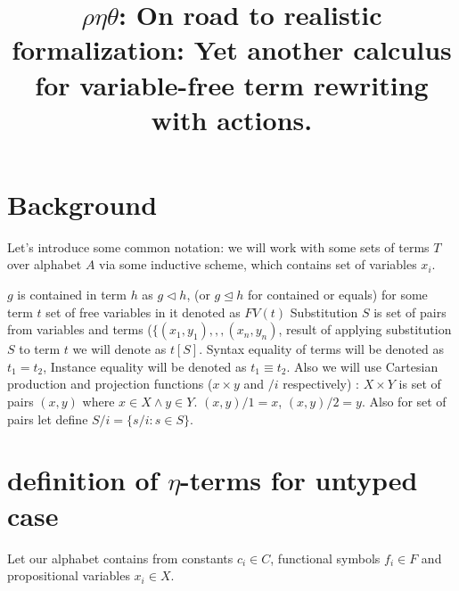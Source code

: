 \documentclass[10pt]{article}
\title{ $\rho\eta\theta$: On road to realistic formalization:
   Yet another calculus for variable-free term rewriting with actions.
      }
\begin{document}
                                               
\maketitle{}

\tableofcontents



\section{ Background }

 Let's introduce some common notation: we will work with some sets of terms $T$ over
 alphabet $A$ via some inductive scheme, which contains set of variables $x_{i}$.
 
 $g$ is contained in term $h$ as $g\lhd h$,
 (or $g\unlhd h$ for contained or equals)
 for some term $t$ set of free variables in it denoted as $FV(t)$  
 Substitution $S$ is set of pairs from variables and terms 
 ($\{(x_1,y_1), ,, (x_{n},y_{n})$, result of applying substitution $S$ to 
 term $t$ we will denote as $t[S]$.  
 Syntax equality of terms will be denoted as $t_{1} = t_{2}$, 
 Instance equality will be denoted as $t_{1}\equiv t_{2}$.
 Also we will use Cartesian production and projection functions ($x\times y$ and 
 $/i$  respectively) : $X\times Y$ is set of pairs $(x,y)$ where
  $x \in X \land y\in Y$.  $(x,y)/1=x$, $(x,y)/2=y$. Also for set of
  pairs let define $S/i = \{s/i : s\in S\}$.    
 
\section{ definition of $\eta$-terms for untyped case }

 Let our alphabet contains from constants $c_i \in C$, functional symbols $f_i \in F$ and
propositional variables $x_i \in X$.
\end{document}
